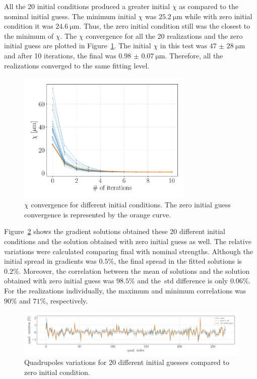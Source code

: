 All the 20 initial conditions produced a greater initial $\chi$ as compared to the nominal initial guess. The minimum initial $\chi$ was $\SI{25.2}{\micro\meter}$ while with zero initial condition it was $\SI{24.6}{\micro\meter}$. Thus, the zero initial condition still was the closest to the minimum of $\chi$. The $\chi$ convergence for all the 20 realizations and the zero initial guess are plotted in Figure~\ref{fig:chi_ini_guess}. The initial $\chi$ in this test was $\SI{47(28)}{\micro\meter}$ and after 10 iterations, the final was $\SI{0.98(7)}{\micro\meter}$. Therefore, all the realizations converged to the same fitting level.
\begin{figure}
\centering
\includegraphics[width=0.75\textwidth]{figures/chi_convergence_initial_guess.pdf}
\caption{$\chi$ convergence for different initial conditions. The zero initial guess convergence is represented by the orange curve.}
\label{fig:chi_ini_guess}
\end{figure}

Figure~\ref{fig:quad_stren_ini_guess} shows the gradient solutions obtained these 20 different initial conditions and the solution obtained with zero initial guess as well. The relative variations were calculated comparing final with nominal strengths. Although the initial spread in gradients was $0.5\%$, the final spread in the fitted solutions is $0.2\%$. Moreover, the correlation between the mean of solutions and the solution obtained with zero initial guess was $98.5\%$ and the~\gls{std} difference is only $0.06\%$. For the realizations individually, the maximum and minimum correlations was $90\%$ and $71\%$, respectively.
\begin{figure}
\centering
\includegraphics[width=1.0\textwidth]{figures/quad_stren_initial_guess.pdf}
\caption{Quadrupoles variations for 20 different initial guesses compared to zero initial condition.}
\label{fig:quad_stren_ini_guess}
\end{figure}

